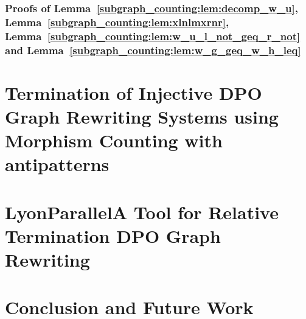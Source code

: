 \documentclass{report}
\begin{document}
\subsection*{Proofs of Lemma~\ref{subgraph_counting:lem:decomp_w_u}, Lemma~\ref{subgraph_counting:lem:xlnlmxrnr}, Lemma~\ref{subgraph_counting:lem:w_u_l_not_geq_r_not} and Lemma~\ref{subgraph_counting:lem:w_g_geq_w_h_leq}}
\label{subgraph_counting:sec:appendix:a}




\chapter{Termination of Injective DPO Graph Rewriting
Systems using Morphism Counting with antipatterns}
\label{chap:antipattern}
 


 
\chapter{LyonParallel\textemdash A Tool for Relative Termination DPO Graph Rewriting} 
\label{chap:lyonparallel}

\chapter{Conclusion and Future Work}
\label{chap:conclusion}



\printbibliography 
\printindex
\end{document}
